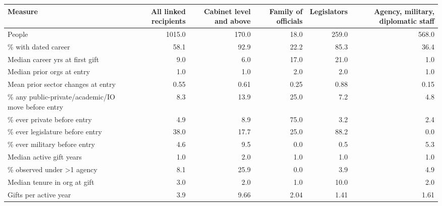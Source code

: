\begin{tabular}{lrrrrr}
\toprule
Measure & All linked recipients & Cabinet level and above & Family of officials & Legislators & Agency, military, diplomatic staff \\
\midrule
People & 1015.0 & 170.0 & 18.0 & 259.0 & 568.0 \\
\% with dated career & 58.1 & 92.9 & 22.2 & 85.3 & 36.4 \\
Median career yrs at first gift & 9.0 & 6.0 & 17.0 & 21.0 & 1.0 \\
Median prior orgs at entry & 1.0 & 1.0 & 2.0 & 2.0 & 1.0 \\
Mean prior sector changes at entry & 0.55 & 0.61 & 0.25 & 0.88 & 0.15 \\
\% any public-private/academic/IO move before entry & 8.3 & 13.9 & 25.0 & 7.2 & 4.8 \\
\% ever private before entry & 4.9 & 8.9 & 75.0 & 3.2 & 2.4 \\
\% ever legislature before entry & 38.0 & 17.7 & 25.0 & 88.2 & 0.0 \\
\% ever military before entry & 4.6 & 9.5 & 0.0 & 0.5 & 5.3 \\
Median active gift years & 1.0 & 2.0 & 1.0 & 1.0 & 1.0 \\
\% observed under >1 agency & 8.1 & 25.9 & 0.0 & 3.9 & 4.9 \\
Median tenure in org at gift & 3.0 & 2.0 & 1.0 & 10.0 & 2.0 \\
Gifts per active year & 3.9 & 9.66 & 2.04 & 1.41 & 1.61 \\
\bottomrule
\end{tabular}
\par{}
